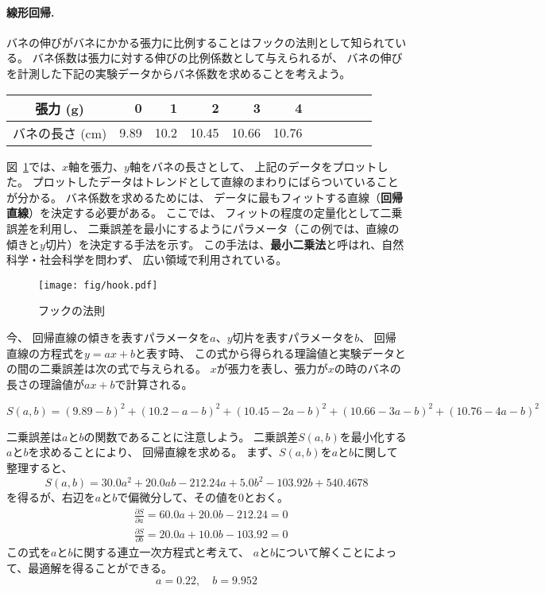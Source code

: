 \paragraph{線形回帰.}
バネの伸びがバネにかかる張力に比例することはフックの法則として知られている。
バネ係数は張力に対する伸びの比例係数として与えられるが、
バネの伸びを計測した下記の実験データからバネ係数を求めることを考えよう。

\begin{center}
\begin{tabular}{c|rrrrrrrrrr}
  \toprule
  張力 (g) & 0 & 1 & 2 & 3 & 4 \\
  \midrule
  バネの長さ (cm) & 9.89 & 10.2 & 10.45 & 10.66 & 10.76 \\
  \bottomrule
\end{tabular}
\end{center}

図~\ref{fig:hook}では、$x$軸を張力、$y$軸をバネの長さとして、
上記のデータをプロットした。
プロットしたデータはトレンドとして直線のまわりにばらついていることが分かる。
バネ係数を求めるためには、
データに最もフィットする直線（\textbf{回帰直線}）を決定する必要がある。
ここでは、
フィットの程度の定量化として二乗誤差を利用し、
二乗誤差を最小にするようにパラメータ（この例では、直線の傾きと$y$切片）を決定する手法を示す。
この手法は、\textbf{最小二乗法}と呼はれ、自然科学・社会科学を問わず、
広い領域で利用されている。

\begin{figure}
  \centering
  \texttt{[image: fig/hook.pdf]}
  \caption{フックの法則}
  \label{fig:hook}
\end{figure}

今、
回帰直線の傾きを表すパラメータを$a$、$y$切片を表すパラメータを$b$、
回帰直線の方程式を$y = ax + b$と表す時、
この式から得られる理論値と実験データとの間の二乗誤差は次の式で与えられる。
$x$が張力を表し、張力が$x$の時のバネの長さの理論値が$ax + b$で計算される。

\[
  S(a, b) = (9.89 - b)^2
  + (10.2  - a - b)^2
  + (10.45 - 2a - b)^2
  + (10.66 - 3a - b)^2
  + (10.76 - 4a - b)^2
\]

二乗誤差は$a$と$b$の関数であることに注意しよう。
二乗誤差$S(a, b)$を最小化する$a$と$b$を求めることにより、
回帰直線を求める。
まず、$S(a, b)$を$a$と$b$に関して整理すると、
\[
  S(a, b) = 30.0 a^{2} + 20.0 a b - 212.24 a + 5.0 b^{2} - 103.92 b + 540.4678
\]
を得るが、右辺を$a$と$b$で偏微分して、その値を0とおく。
\begin{align*}
  &
    \frac{\partial S}{\partial a} = 60.0 a + 20.0 b - 212.24 = 0
  \\&
    \frac{\partial S}{\partial b} = 20.0 a + 10.0 b - 103.92 = 0
\end{align*}
この式を$a$と$b$に関する連立一次方程式と考えて、
$a$と$b$について解くことによって、最適解を得ることができる。
\[
  a = 0.22, \quad b = 9.952
\]

